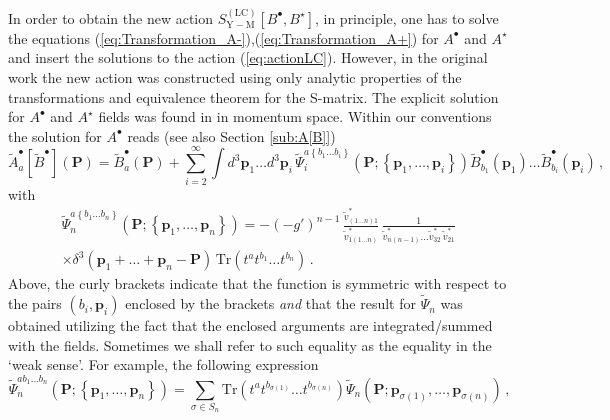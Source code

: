 \documentclass[english,american]{article}
\begin{document}
In order to obtain the new action $S_{\mathrm{Y-M}}^{\left(\mathrm{LC}\right)}\left[B^{\bullet},B^{\star}\right]$,
in principle, one has to solve the equations (\ref{eq:Transformation_A-}),(\ref{eq:Transformation_A+})
for $A^{\bullet}$ and $A^{\star}$ and insert the solutions to the
action (\ref{eq:actionLC}). However, in the original work \citep{Mansfield2006}
the new action was constructed using only analytic properties of the
transformations and equivalence theorem for the S-matrix. The explicit
solution for $A^{\bullet}$ and $A^{\star}$ fields was found in \citep{Ettle2006b}
in momentum space. Within our conventions the solution for $A^{\bullet}$  reads (see also Section \ref{sub:A[B]}) 
\begin{equation}
\tilde{A}_{a}^{\bullet}\left[\tilde{B}^{\bullet}\right]\left(\mathbf{P}\right)=\tilde{B}_{a}^{\bullet}\left(\mathbf{P}\right)+\sum_{i=2}^{\infty}\int d^{3}\mathbf{p}_{1}\dots d^{3}\mathbf{p}_{i}\,\tilde{\Psi}_{i}^{a\left\{ b_{1}\dots b_{i}\right\} }\left(\mathbf{P};\left\{ \mathbf{p}_{1},\dots,\mathbf{p}_{i}\right\} \right)\tilde{B}_{b_{1}}^{\bullet}\left(\mathbf{p}_{1}\right)\dots\tilde{B}_{b_{i}}^{\bullet}\left(\mathbf{p}_{i}\right)\,,\label{eq:Ap[B]}
\end{equation}
with
\begin{multline}
\tilde{\Psi}_{n}^{a\left\{ b_{1}\dots b_{n}\right\} }\left(\mathbf{P};\left\{ \mathbf{p}_{1},\dots,\mathbf{p}_{n}\right\} \right)=-\left(-g'\right)^{n-1}\,\frac{\tilde{v}_{\left(1\dots n\right)1}^{*}}{\tilde{v}_{1\left(1\dots n\right)}^{*}}\,\frac{1}{\tilde{v}_{n\left(n-1\right)}^{*}\dots\tilde{v}_{32}^{*}\,\tilde{v}_{21}^{*}}\,\\
\times\delta^{3}\left(\mathbf{p}_{1}+\dots+\mathbf{p}_{n}-\mathbf{P}\right)\,\mathrm{Tr}\left(t^{a}t^{b_{1}}\dots t^{b_{n}}\right)\,.\label{eq:Psi_n}
\end{multline}
Above, the curly brackets indicate that the function is symmetric
with respect to the pairs $\left(b_{i},\mathbf{p}_{i}\right)$ enclosed
by the brackets \textit{and} that the result for $\tilde{\Psi}_{n}$
was obtained utilizing the fact that the enclosed arguments are integrated/summed
with the fields. Sometimes we shall refer to such equality as the
equality in the `weak sense'. For example, the following expression
\begin{equation}
\tilde{\Psi}_{n}^{ab_{1}\dots b_{n}}\left(\mathbf{P};\left\{ \mathbf{p}_{1},\dots,\mathbf{p}_{n}\right\} \right)=\sum_{\sigma\in S_{n}}\mathrm{Tr}\left(t^{a}t^{b_{\sigma\left(1\right)}}\dots t^{b_{\sigma\left(n\right)}}\right)\tilde{\Psi}_{n}\left(\mathbf{P};\mathbf{p}_{\sigma\left(1\right)},\dots,\mathbf{p}_{\sigma\left(n\right)}\right)\,,\label{eq:Psi_color_decomp}
\end{equation}
\end{document}
